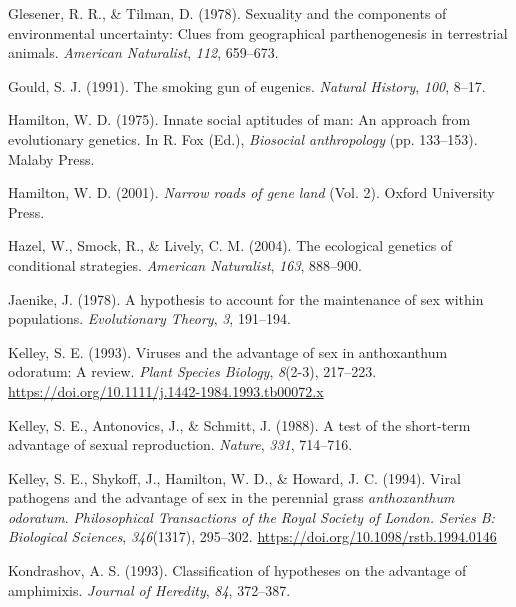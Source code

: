 \documentclass[
  letterpaper,
]{book}
\newlength{\cslhangindent}
\newlength{\cslentryspacingunit} %
\newenvironment{CSLReferences}[2] %
 {%
  \setlength{\parindent}{0pt}
  \ifodd #1
  \let\oldpar\par
  \def\par{\hangindent=\cslhangindent\oldpar}
  \fi
  \setlength{\parskip}{#2\cslentryspacingunit}
 }%
 {}
\begin{document}
\begin{CSLReferences}{1}{0}
\leavevmode{}%
Glesener, R. R., \& Tilman, D. (1978). Sexuality and the components of
environmental uncertainty: Clues from geographical parthenogenesis in
terrestrial animals. \emph{American Naturalist}, \emph{112}, 659--673.

\leavevmode{}%
Gould, S. J. (1991). The smoking gun of eugenics. \emph{Natural
History}, \emph{100}, 8--17.

\leavevmode{}%
Hamilton, W. D. (1975). Innate social aptitudes of man: An approach from
evolutionary genetics. In R. Fox (Ed.), \emph{Biosocial anthropology}
(pp. 133--153). Malaby Press.

\leavevmode{}%
Hamilton, W. D. (2001). \emph{Narrow roads of gene land} (Vol. 2).
Oxford University Press.

\leavevmode{}%
Hazel, W., Smock, R., \& Lively, C. M. (2004). The ecological genetics
of conditional strategies. \emph{American Naturalist}, \emph{163},
888--900.

\leavevmode{}%
Jaenike, J. (1978). A hypothesis to account for the maintenance of sex
within populations. \emph{Evolutionary Theory}, \emph{3}, 191--194.

\leavevmode{}%
Kelley, S. E. (1993). Viruses and the advantage of sex in anthoxanthum
odoratum: A review. \emph{Plant Species Biology}, \emph{8}(2-3),
217--223. \url{https://doi.org/10.1111/j.1442-1984.1993.tb00072.x}

\leavevmode{}%
Kelley, S. E., Antonovics, J., \& Schmitt, J. (1988). A test of the
short-term advantage of sexual reproduction. \emph{Nature}, \emph{331},
714--716.

\leavevmode{}%
Kelley, S. E., Shykoff, J., Hamilton, W. D., \& Howard, J. C. (1994).
Viral pathogens and the advantage of sex in the perennial grass
\emph{anthoxanthum odoratum}. \emph{Philosophical Transactions of the
Royal Society of London. Series B: Biological Sciences},
\emph{346}(1317), 295--302. \url{https://doi.org/10.1098/rstb.1994.0146}

\leavevmode{}%
Kondrashov, A. S. (1993). Classification of hypotheses on the advantage
of amphimixis. \emph{Journal of Heredity}, \emph{84}, 372--387.


\end{CSLReferences}
\end{document}
